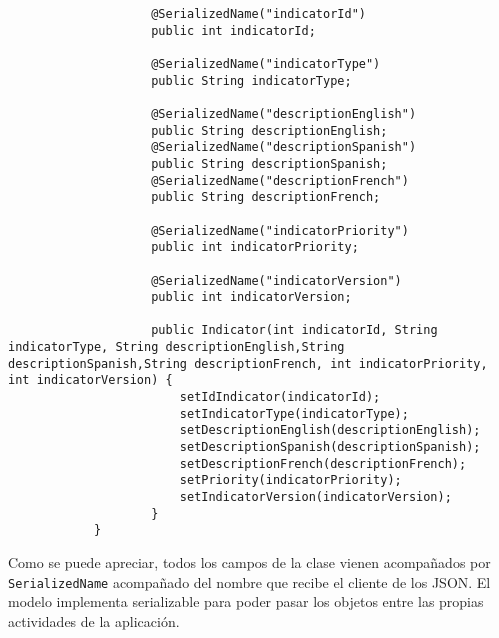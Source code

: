 \begin{itemize}
\begin{itemize}
\begin{lstlisting}
                    @SerializedName("indicatorId")
                    public int indicatorId;

                    @SerializedName("indicatorType")
                    public String indicatorType;

                    @SerializedName("descriptionEnglish")
                    public String descriptionEnglish;
                    @SerializedName("descriptionSpanish")
                    public String descriptionSpanish;
                    @SerializedName("descriptionFrench")
                    public String descriptionFrench;

                    @SerializedName("indicatorPriority")
                    public int indicatorPriority;

                    @SerializedName("indicatorVersion")
                    public int indicatorVersion;

                    public Indicator(int indicatorId, String indicatorType, String descriptionEnglish,String descriptionSpanish,String descriptionFrench, int indicatorPriority, int indicatorVersion) {
                        setIdIndicator(indicatorId);
                        setIndicatorType(indicatorType);
                        setDescriptionEnglish(descriptionEnglish);
                        setDescriptionSpanish(descriptionSpanish);
                        setDescriptionFrench(descriptionFrench);
                        setPriority(indicatorPriority);
                        setIndicatorVersion(indicatorVersion);
                    }
            }
        \end{lstlisting}
        Como se puede apreciar, todos los campos de la clase vienen acompañados por \texttt{SerializedName} acompañado del nombre que recibe el cliente de los JSON. El modelo implementa serializable para poder pasar los objetos entre las propias actividades de la aplicación.
    \end{itemize}
\end{itemize}

